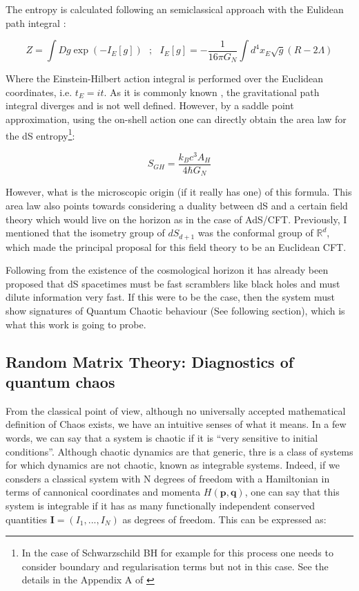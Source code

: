 \documentclass[11pt,a4paper]{article}
\begin{document}
The entropy is calculated following an semiclassical approach with the Eulidean path integral \cite{PhysRevD.15.2752}:

\begin{equation}
    Z = \int Dg \exp\left(-I_E[g]\right) ~~~;~~~ I_E[g] = -\frac{1}{16\pi G_N}\int d^4 x_E \sqrt{g}(R-2\Lambda)
\end{equation}

Where the Einstein-Hilbert action integral is performed over the Euclidean coordinates, i.e. $t_E=it$. As it is commonly known \cite{gibbons_path_1978}, the gravitational path integral diverges and is not well defined. However, by a saddle point approximation, using the on-shell action one can directly obtain the area law for the dS entropy\footnote{In the case of Schwarzschild BH for example for this process one needs to consider boundary and regularisation terms but not in this case. See the details in the Appendix A of \cite{Galante:2023uyf}}:

\begin{equation}
    S_{GH} = \frac{k_Bc^3A_H}{4\hbar G_N}
\end{equation}

However, what is the microscopic origin (if it really has one) of this formula. This area law also points towards considering a duality between dS and a certain field theory which would live on the horizon as in the case of AdS/CFT. Previously, I mentioned that the isometry group of $dS_{d+1}$ was the conformal group of $\mathds{R}^d$, which made the principal proposal for this field theory to be an Euclidean CFT.

Following from the existence of the cosmological horizon it has already been proposed that dS spacetimes must be fast scramblers \cite{Geng_2021} like black holes and must dilute information very fast. If this were to be the case, then the system must show signatures of Quantum Chaotic behaviour (See following section), which is what this work is going to probe.

\subsection{Random Matrix Theory: Diagnostics of quantum chaos}

From the classical point of view, although no universally accepted mathematical definition of Chaos exists, we have an intuitive senses of what it means. In a few words, we can say that a system is chaotic if it is \textquotedblleft very sensitive to initial conditions\textquotedblright. Although chaotic dynamics are that generic, thre is a class of systems 
for which dynamics are not chaotic, known as integrable systems. Indeed, if we consders a classical system with N degrees of freedom with a Hamiltonian in terms of cannonical coordinates and momenta $H(\mathbf{p},\mathbf{q})$, one can say that this system is integrable if it has as many functionally independent conserved quantities $\mathbf{I}=\left(I_1,...,I_N\right)$ as degrees of freedom. This can be expressed as:
\end{document}
